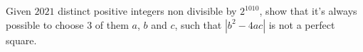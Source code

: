 Given $2021$ distinct positive integers non divisible by $2^{1010}$, show that it's always possible to choose $3$ of them $a$, $b$ and $c$, such that $|b^2-4ac|$ is not a perfect square.